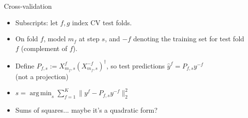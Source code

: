 \documentclass{beamer}
\newcommand{\tr}{\text{tr}}
\newcommand{\te}{\text{te}}
\DeclareMathOperator*{\argmin}{arg\,min}
\begin{document}

\begin{frame}{Cross-validation}
  
  \begin{itemize}

  \item Subscripts: let $f, g$ index CV test folds. 

  \item On fold $f$, model $m_f$ at step $s$, and $-f$ denoting the
    training set for test fold $f$ (complement of $f$). 

  \item Define $P_{f,s} := X^f_{m_f,s}(X^{-f}_{m_f,s})^\dagger$, so
    test predictions $\hat y^{f} = P_{f,s}y^{-f}$ \\
    {\footnotesize \color{blue} (not a projection)}

  \item $s = \argmin_s \sum_{f=1}^K \| y^{f} - P_{f,s} y^{-f} \|_2^2$ 

  \item Sums of squares... maybe it's a quadratic form?

  \end{itemize}

\end{frame}
\end{document}
